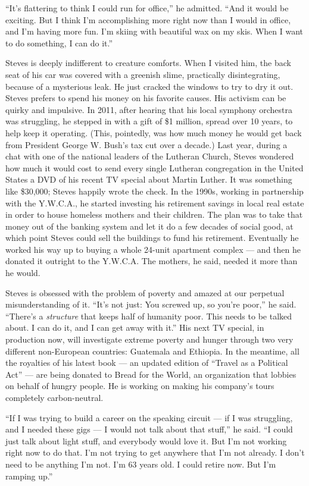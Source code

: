 ``It's flattering to think I could run for office,'' he admitted. ``And
it would be exciting. But I think I'm accomplishing more right now than
I would in office, and I'm having more fun. I'm skiing with beautiful
wax on my skis. When I want to do something, I can do it.''

Steves is deeply indifferent to creature comforts. When I visited him,
the back seat of his car was covered with a greenish slime, practically
disintegrating, because of a mysterious leak. He just cracked the
windows to try to dry it out. Steves prefers to spend his money on his
favorite causes. His activism can be quirky and impulsive. In 2011,
after hearing that his local symphony orchestra was struggling, he
stepped in with a gift of \$1 million, spread over 10 years, to help
keep it operating. (This, pointedly, was how much money he would get
back from President George W. Bush's tax cut over a decade.) Last year,
during a chat with one of the national leaders of the Lutheran Church,
Steves wondered how much it would cost to send every single Lutheran
congregation in the United States a DVD of his recent TV special about
Martin Luther. It was something like \$30,000; Steves happily wrote the
check. In the 1990s, working in partnership with the Y.W.C.A., he
started investing his retirement savings in local real estate in order
to house homeless mothers and their children. The plan was to take that
money out of the banking system and let it do a few decades of social
good, at which point Steves could sell the buildings to fund his
retirement. Eventually he worked his way up to buying a whole 24-unit
apartment complex --- and then he donated it outright to the Y.W.C.A.
The mothers, he said, needed it more than he would.

Steves is obsessed with the problem of poverty and amazed at our
perpetual misunderstanding of it. ``It's not just: You screwed up, so
you're poor,'' he said. ``There's a \emph{structure} that keeps half of
humanity poor. This needs to be talked about. I can do it, and I can get
away with it.'' His next TV special, in production now, will investigate
extreme poverty and hunger through two very different non-European
countries: Guatemala and Ethiopia. In the meantime, all the royalties of
his latest book --- an updated edition of ``Travel as a Political Act''
--- are being donated to Bread for the World, an organization that
lobbies on behalf of hungry people. He is working on making his
company's tours completely carbon-neutral.

``If I was trying to build a career on the speaking circuit --- if I was
struggling, and I needed these gigs --- I would not talk about that
stuff,'' he said. ``I could just talk about light stuff, and everybody
would love it. But I'm not working right now to do that. I'm not trying
to get anywhere that I'm not already. I don't need to be anything I'm
not. I'm 63 years old. I could retire now. But I'm ramping up.''

